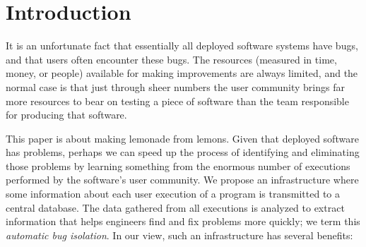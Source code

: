 \section{Introduction}
\label{sec:introduction}

It is an unfortunate fact that essentially all deployed software
systems have bugs, and that users often encounter these bugs.  The
resources (measured in time, money, or people) available for making
improvements are always limited, and the normal case is that just
through sheer numbers the user community brings far more resources to
bear on testing a piece of software than the team responsible for
producing that software.  

This paper is about making lemonade from lemons.  Given that deployed
software has problems, perhaps we can speed up the process of
identifying and eliminating those problems by learning something from
the enormous number of executions performed by the software's user
community.  We propose an infrastructure where some information about
each user execution of a program is transmitted to a central database.
The data gathered from all executions is analyzed to extract
information that helps engineers find and fix problems more quickly;
we term this {\em automatic bug isolation}.
In our view, such an infrastructure has several benefits:
